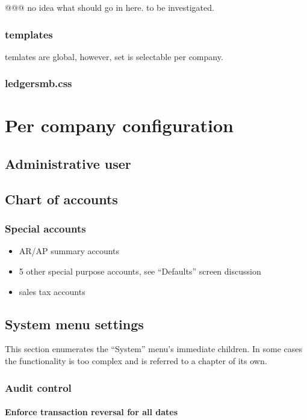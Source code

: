 @@@ no idea what should go in here. to be investigated.

\subsection{templates}
\label{subsec:GlobalConfigTemplates}

temlates are global, however, set is selectable per company.




\subsection{ledgersmb.css}

\chapter{Per company configuration}

\section{Administrative user}
\section{Chart of accounts}
\subsection{Special accounts}
\begin{itemize}
\item AR/AP summary accounts
\item 5 other special purpose accounts, see ``Defaults'' screen discussion
\item sales tax accounts
\end{itemize}


\section{System menu settings}

This section enumerates the ``System'' menu's immediate children. In some cases the
functionality is too complex and is referred to a chapter of its own.

\subsection{Audit control}

\subsubsection{Enforce transaction reversal for all dates}


